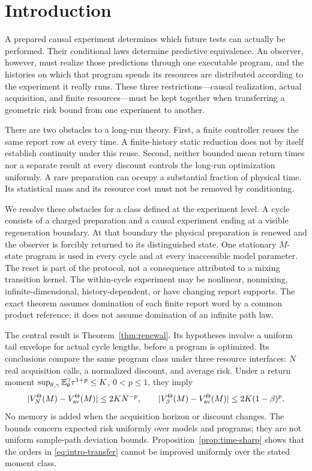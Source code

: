 \section{Introduction}\label{sec:intro}
A prepared causal experiment determines which future tests can actually be performed. Their conditional laws determine predictive equivalence. An observer, however, must realize those predictions through one executable program, and the histories on which that program spends its resources are distributed according to the experiment it really runs. These three restrictions---causal realization, actual acquisition, and finite resources---must be kept together when transferring a geometric risk bound from one experiment to another.

There are two obstacles to a long-run theory. First, a finite controller reuses the same report row at every time. A finite-history static reduction does not by itself establish continuity under this reuse. Second, neither bounded mean return times nor a separate result at every discount controls the long-run optimization uniformly. A rare preparation can occupy a substantial fraction of physical time. Its statistical mass and its resource cost must not be removed by conditioning.

We resolve these obstacles for a class defined at the experiment level. A cycle consists of a charged preparation and a causal experiment ending at a visible regeneration boundary. At that boundary the physical preparation is renewed and the observer is forcibly returned to its distinguished state. One stationary $M$-state program is used in every cycle and at every inaccessible model parameter. The reset is part of the protocol, not a consequence attributed to a mixing transition kernel. The within-cycle experiment may be nonlinear, nonmixing, infinite-dimensional, history-dependent, or have changing report supports. The exact theorem assumes domination of each finite report word by a common product reference; it does not assume domination of an infinite path law.

The central result is Theorem~\ref{thm:renewal}. Its hypotheses involve a uniform tail envelope for actual cycle lengths, before a program is optimized. Its conclusions compare the same program class under three resource interfaces: $N$ real acquisition calls, a normalized discount, and average risk. Under a return moment $\sup_{\theta,\gamma}\mathbb E_\theta^\gamma\tau^{1+p}\le K$, $0<p\le1$, they imply
\begin{equation}\label{eq:intro-transfer}
 |V_N^\Theta(M)-V_{\mathrm{av}}^\Theta(M)|\le 2K N^{-p},\qquad
 |V_\beta^\Theta(M)-V_{\mathrm{av}}^\Theta(M)|\le 2K(1-\beta)^p.
\end{equation}
No memory is added when the acquisition horizon or discount changes. The bounds concern expected risk uniformly over models and programs; they are not uniform sample-path deviation bounds. Proposition~\ref{prop:time-sharp} shows that the orders in \eqref{eq:intro-transfer} cannot be improved uniformly over the stated moment class.

